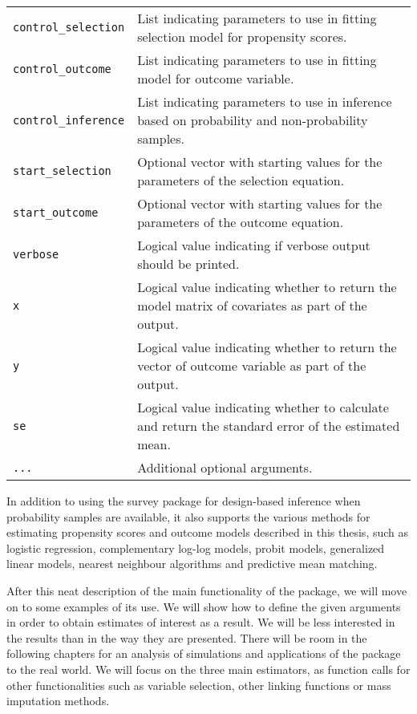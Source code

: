 \documentclass[
]{jss}
\begin{document}
\begin{longtable}{>{\ttfamily}p{5cm}p{10.5cm}}
    \texttt{control\_selection} & List indicating parameters to use in fitting selection model for propensity scores. \\
    \texttt{control\_outcome} & List indicating parameters to use in fitting model for outcome variable. \\
    \texttt{control\_inference} & List indicating parameters to use in inference based on probability and non-probability samples. \\
    \texttt{start\_selection} & Optional vector with starting values for the parameters of the selection equation. \\
    \texttt{start\_outcome} & Optional vector with starting values for the parameters of the outcome equation. \\
    \texttt{verbose} & Logical value indicating if verbose output should be printed. \\
    \texttt{x} & Logical value indicating whether to return the model matrix of covariates as part of the output. \\
    \texttt{y} & Logical value indicating whether to return the vector of outcome variable as part of the output. \\
    \texttt{se} & Logical value indicating whether to calculate and return the standard error of the estimated mean. \\
    \texttt{...} & Additional optional arguments. \\
\end{longtable}

In addition to using the survey package for design-based inference when
probability samples are available, it also supports the various methods
for estimating propensity scores and outcome models described in this
thesis, such as logistic regression, complementary log-log models,
probit models, generalized linear models, nearest neighbour algorithms
and predictive mean matching.

After this neat description of the main functionality of the package, we
will move on to some examples of its use. We will show how to define the
given arguments in order to obtain estimates of interest as a result. We
will be less interested in the results than in the way they are
presented. There will be room in the following chapters for an analysis
of simulations and applications of the package to the real world. We
will focus on the three main estimators, as function calls for other
functionalities such as variable selection, other linking functions or
mass imputation methods.
\end{document}

